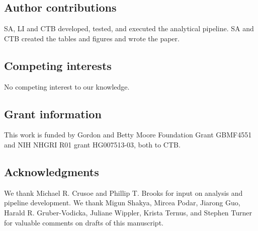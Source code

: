\documentclass[11pt]{article}
\begin{document}
\subsection*{Author contributions}

SA, LI and CTB developed, tested, and executed the analytical pipeline.
SA and CTB created the tables and figures and wrote the paper.

\subsection*{Competing interests}
No competing interest to our knowledge.

\subsection*{Grant information}
This work is funded by
Gordon and Betty Moore Foundation Grant GBMF4551 and
NIH NHGRI R01 grant HG007513-03, both to CTB.

\subsection*{Acknowledgments}
We thank Michael R. Crusoe and Phillip T. Brooks for input on analysis
and pipeline development.  We thank Migun Shakya, Mircea Podar, Jiarong Guo,
Harald R. Gruber-Vodicka, Juliane Wippler, Krista Ternus, and Stephen
Turner for valuable comments on drafts of this manuscript.

{\small }

\bigskip








\end{document}
